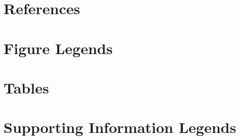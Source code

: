 \section*{References}

%
%
% 





\section*{Figure Legends}
%


\section*{Tables}
% 
%
%

\section*{Supporting Information Legends}
%
% 



